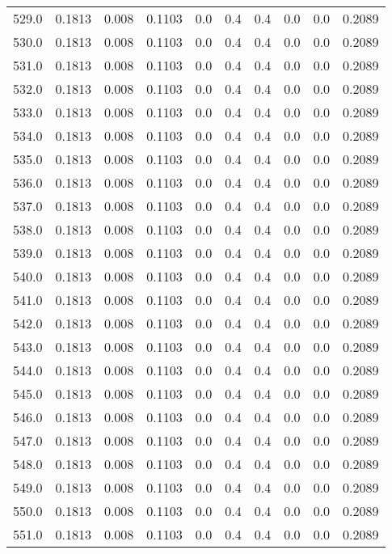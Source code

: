 \begin{longtable}{lrrrrrrrrr}
529.0 & 0.1813 & 0.008 & 0.1103 & 0.0 & 0.4 & 0.4 & 0.0 & 0.0 & 0.2089 \\
530.0 & 0.1813 & 0.008 & 0.1103 & 0.0 & 0.4 & 0.4 & 0.0 & 0.0 & 0.2089 \\
531.0 & 0.1813 & 0.008 & 0.1103 & 0.0 & 0.4 & 0.4 & 0.0 & 0.0 & 0.2089 \\
532.0 & 0.1813 & 0.008 & 0.1103 & 0.0 & 0.4 & 0.4 & 0.0 & 0.0 & 0.2089 \\
533.0 & 0.1813 & 0.008 & 0.1103 & 0.0 & 0.4 & 0.4 & 0.0 & 0.0 & 0.2089 \\
534.0 & 0.1813 & 0.008 & 0.1103 & 0.0 & 0.4 & 0.4 & 0.0 & 0.0 & 0.2089 \\
535.0 & 0.1813 & 0.008 & 0.1103 & 0.0 & 0.4 & 0.4 & 0.0 & 0.0 & 0.2089 \\
536.0 & 0.1813 & 0.008 & 0.1103 & 0.0 & 0.4 & 0.4 & 0.0 & 0.0 & 0.2089 \\
537.0 & 0.1813 & 0.008 & 0.1103 & 0.0 & 0.4 & 0.4 & 0.0 & 0.0 & 0.2089 \\
538.0 & 0.1813 & 0.008 & 0.1103 & 0.0 & 0.4 & 0.4 & 0.0 & 0.0 & 0.2089 \\
539.0 & 0.1813 & 0.008 & 0.1103 & 0.0 & 0.4 & 0.4 & 0.0 & 0.0 & 0.2089 \\
540.0 & 0.1813 & 0.008 & 0.1103 & 0.0 & 0.4 & 0.4 & 0.0 & 0.0 & 0.2089 \\
541.0 & 0.1813 & 0.008 & 0.1103 & 0.0 & 0.4 & 0.4 & 0.0 & 0.0 & 0.2089 \\
542.0 & 0.1813 & 0.008 & 0.1103 & 0.0 & 0.4 & 0.4 & 0.0 & 0.0 & 0.2089 \\
543.0 & 0.1813 & 0.008 & 0.1103 & 0.0 & 0.4 & 0.4 & 0.0 & 0.0 & 0.2089 \\
544.0 & 0.1813 & 0.008 & 0.1103 & 0.0 & 0.4 & 0.4 & 0.0 & 0.0 & 0.2089 \\
545.0 & 0.1813 & 0.008 & 0.1103 & 0.0 & 0.4 & 0.4 & 0.0 & 0.0 & 0.2089 \\
546.0 & 0.1813 & 0.008 & 0.1103 & 0.0 & 0.4 & 0.4 & 0.0 & 0.0 & 0.2089 \\
547.0 & 0.1813 & 0.008 & 0.1103 & 0.0 & 0.4 & 0.4 & 0.0 & 0.0 & 0.2089 \\
548.0 & 0.1813 & 0.008 & 0.1103 & 0.0 & 0.4 & 0.4 & 0.0 & 0.0 & 0.2089 \\
549.0 & 0.1813 & 0.008 & 0.1103 & 0.0 & 0.4 & 0.4 & 0.0 & 0.0 & 0.2089 \\
550.0 & 0.1813 & 0.008 & 0.1103 & 0.0 & 0.4 & 0.4 & 0.0 & 0.0 & 0.2089 \\
551.0 & 0.1813 & 0.008 & 0.1103 & 0.0 & 0.4 & 0.4 & 0.0 & 0.0 & 0.2089 \\

\end{longtable}
